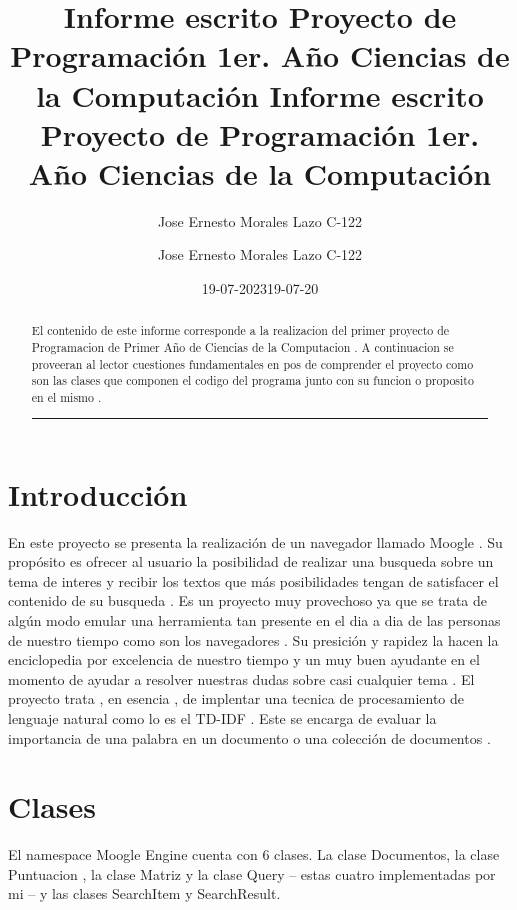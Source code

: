 \documentclass[10pt]{extarticle}
\title{Informe escrito Proyecto de Programación 1er. Año Ciencias de la Computación }
\date{19-07-2023}
\author{Jose Ernesto Morales Lazo C-122}
\begin{document}
	\title{Informe escrito Proyecto de Programación 1er. Año Ciencias de la Computación }
	\author{Jose Ernesto Morales Lazo C-122}
	\date{19-07-20	}


	
	\maketitle
	\vspace{5cm}
	\tableofcontents
	
	
	\newpage
	\begin{abstract}
		El contenido de este informe corresponde a la realizacion del primer proyecto de Programacion de Primer Año de Ciencias de la Computacion . A continuacion se proveeran al lector cuestiones fundamentales en pos de comprender el proyecto como son las clases que componen el codigo del programa junto  con su funcion o proposito en el mismo . \textcolor{yellow}{\rule{10.50cm}{2pt}}
		
	\end{abstract}
	
	
	\section{Introducción}\label{sec:introduccion}
    \begin{multicols}{2}
    	En este proyecto se presenta la realización de un navegador llamado Moogle . Su propósito es ofrecer al usuario la posibilidad de realizar una busqueda sobre un tema de interes y recibir los textos que más posibilidades tengan de satisfacer el contenido de su busqueda . Es un proyecto muy provechoso ya que se trata de algún modo emular una herramienta tan presente en el dia a dia de las personas de nuestro tiempo como son los navegadores . Su presición y rapidez la hacen la enciclopedia por excelencia de nuestro tiempo y un muy buen ayudante en el momento de ayudar a resolver nuestras dudas sobre casi cualquier tema . El proyecto trata , en esencia , de implentar una tecnica de procesamiento de lenguaje natural como lo es el TD-IDF . Este se encarga de evaluar la importancia de una palabra en un documento o una colección de documentos . 
    \end{multicols}
    
    \section{Clases}\label{sec:clases} 
    
    El namespace Moogle Engine cuenta con 6 clases. La clase Documentos, la clase Puntuacion , la 
    clase Matriz y la clase Query – estas cuatro implementadas por mi – y las clases SearchItem y 
    SearchResult.
    
\end{document}
